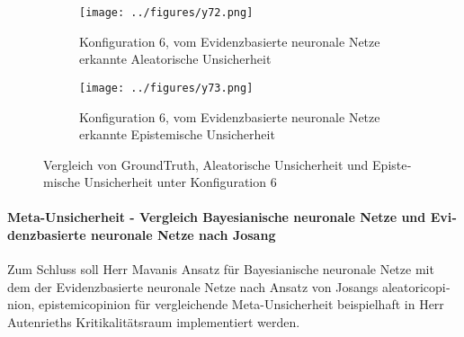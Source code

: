 \begin{otherlanguage}{ngerman}
{\begin{figure}[!ht]
  \centering

  \begin{subfigure}[t]{\textwidth}
    \centering
    \texttt{[image: ../figures/y72.png]}
    \caption{Konfiguration 6, vom \gls{Evidenzbasierte neuronale Netze} erkannte \gls{Aleatorische Unsicherheit}}
    \label{fig:bild32}
  \end{subfigure}

  \vspace{0.5em}

  \begin{subfigure}[t]{\textwidth}
    \centering
    \texttt{[image: ../figures/y73.png]}
    \caption{Konfiguration 6, vom \gls{Evidenzbasierte neuronale Netze} erkannte \gls{Epistemische Unsicherheit}}
    \label{fig:bild33}
  \end{subfigure}

  \caption{Vergleich von \gls{GroundTruth}, \gls{Aleatorische Unsicherheit} und \gls{Epistemische Unsicherheit} unter Konfiguration 6}
  \label{fig:three_subfigures3}
\end{figure}



\paragraph{Meta-Unsicherheit - Vergleich \gls{Bayesianische neuronale Netze} und \gls{Evidenzbasierte neuronale Netze} nach Josang} Zum Schluss soll Herr Mavanis Ansatz für \gls{Bayesianische neuronale Netze} mit dem der \gls{Evidenzbasierte neuronale Netze} nach Ansatz von Josangs \gls{aleatoricopinion}, \gls{epistemicopinion} für vergleichende Meta-Unsicherheit beispielhaft in Herr Autenrieths Kritikalitätsraum implementiert werden. 



}
\end{otherlanguage}

